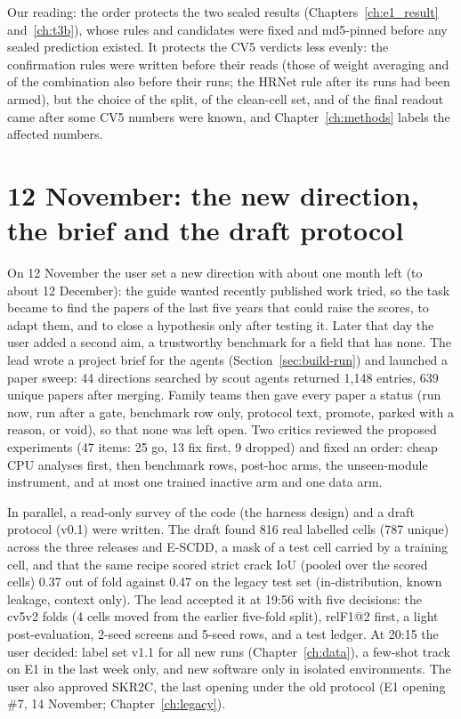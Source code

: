 Our reading: the order protects the two sealed results (Chapters~\ref{ch:e1_result} and~\ref{ch:t3b}), whose rules and candidates
were fixed and md5-pinned before any sealed prediction existed. It protects the CV5 verdicts less evenly: the confirmation rules were
written before their reads (those of weight averaging and of the combination also before their runs; the HRNet rule after its
runs had been armed), but the choice of the split, of the clean-cell set, and of the final readout came after some CV5 numbers
were known, and Chapter~\ref{ch:methods} labels the affected numbers.

\section{12 November: the new direction, the brief and the draft protocol}\label{sec:build-12nov}

On 12 November the user set a new direction with about one month left (to about 12 December): the guide wanted recently published
work tried, so the task became to find the papers of the last five years that could raise the scores, to adapt
them, and to close a hypothesis only after testing it. Later that day the user added a second aim, a
trustworthy benchmark for a field that has none. The lead wrote a project brief for the agents (Section~\ref{sec:build-run}) and
launched a paper sweep: 44 directions searched by scout agents returned 1,148 entries, 639 unique papers after merging. Family
teams then gave every paper a status (run now, run after a gate, benchmark row only, protocol text, promote, parked with a reason,
or void), so that none was left open. Two critics reviewed the proposed experiments (47 items: 25 go, 13 fix first, 9 dropped) and
fixed an order: cheap CPU analyses first, then benchmark rows, post-hoc arms, the unseen-module instrument, and at most one trained
inactive arm and one data arm.

In parallel, a read-only survey of the code (the harness design) and a draft protocol (v0.1) were written. The draft found 816 real
labelled cells (787 unique) across the three releases and E-SCDD, a mask of a test cell carried by a training cell, and that the
same recipe scored strict crack IoU (pooled over the scored cells) 0.37 out of fold against 0.47 on the legacy test set
(in-distribution, known leakage, context only).
The lead accepted it at 19:56 with five decisions: the cv5v2 folds (4 cells moved from the earlier five-fold split), relF1@2
first, a light post-evaluation, 2-seed screens and 5-seed rows, and a test ledger. At 20:15 the user decided: label set v1.1 for
all new runs (Chapter~\ref{ch:data}), a few-shot track on E1 in the last week only, and new software only in isolated environments.
The user also approved SKR2C, the last opening under the old protocol (E1 opening \#7, 14 November; Chapter~\ref{ch:legacy}).


